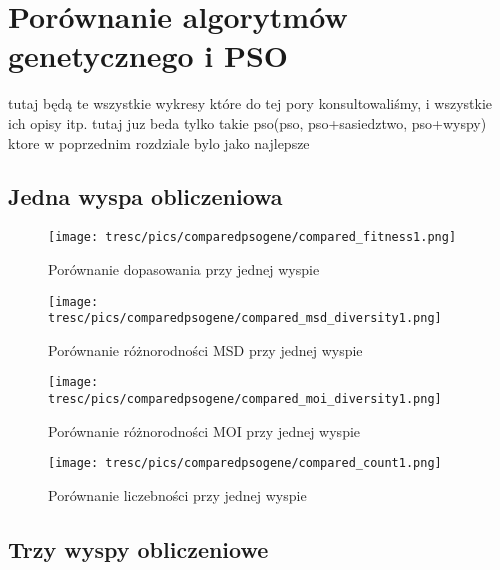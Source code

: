 \chapter{Porównanie algorytmów genetycznego i PSO}
\label{cha:psovsemas}


tutaj będą te wszystkie wykresy które do tej pory konsultowaliśmy, i wszystkie ich opisy itp.
tutaj juz beda tylko takie pso(pso, pso+sasiedztwo, pso+wyspy) ktore w poprzednim rozdziale bylo jako najlepsze


\section{Jedna wyspa obliczeniowa}

\begin{figure}[H]
\begin{center} 
\texttt{[image: tresc/pics/comparedpsogene/compared\_fitness1.png]}
\caption{Porównanie dopasowania przy jednej wyspie}
\label{fig:compared_fintess1}
\end{center}
\end{figure}

\begin{figure}[H]
\begin{center} 
\texttt{[image: tresc/pics/comparedpsogene/compared\_msd\_diversity1.png]}
\caption{Porównanie różnorodności MSD przy jednej wyspie}
\label{fig:compared_msd_diversity1}
\end{center}
\end{figure}

\begin{figure}[H]
\begin{center} 
\texttt{[image: tresc/pics/comparedpsogene/compared\_moi\_diversity1.png]}
\caption{Porównanie różnorodności MOI przy jednej wyspie}
\label{fig:compared_moi_diversity1}
\end{center}
\end{figure}

\begin{figure}[H]
\begin{center} 
\texttt{[image: tresc/pics/comparedpsogene/compared\_count1.png]}
\caption{Porównanie liczebności przy jednej wyspie}
\label{fig:compared_count1}
\end{center}
\end{figure}


\section{Trzy wyspy obliczeniowe}

